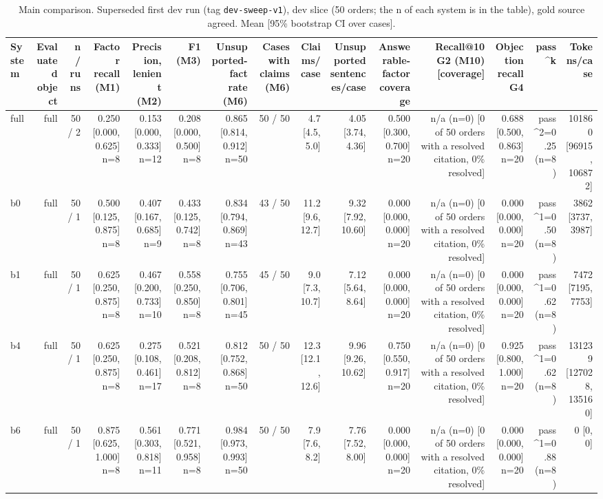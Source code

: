 \begin{table}[t]
\centering
\small
\caption{Main comparison. Superseded first dev run (tag \texttt{dev-sweep-v1}), dev slice (50 orders; the n of each system is in the table), gold source agreed. Mean [95\% bootstrap CI over cases].}
\label{tab:table1_main}
\begin{adjustbox}{max width=\textheight}
\begin{tabular}{lrrrrrrrrrrrrrr}
\toprule
System & Evaluated object & n / runs & Factor recall (M1) & Precision, lenient (M2) & F1 (M3) & Unsupported-fact rate (M6) & Cases with claims (M6) & Claims/case & Unsupported sentences/case & Answerable-factor coverage & Recall@10 G2 (M10) [coverage] & Objection recall G4 & pass\textasciicircum{}k & Tokens/case \\
\midrule
full & full & 50 / 2 & 0.250 [0.000, 0.625] n=8 & 0.153 [0.000, 0.333] n=12 & 0.208 [0.000, 0.500] n=8 & 0.865 [0.814, 0.912] n=50 & 50 / 50 & 4.7 [4.5, 5.0] & 4.05 [3.74, 4.36] & 0.500 [0.300, 0.700] n=20 & n/a (n=0) [0 of 50 orders with a resolved citation, 0\% resolved] & 0.688 [0.500, 0.863] n=20 & pass\textasciicircum{}2=0.25 (n=8) & 101860 [96915, 106872] \\
b0 & full & 50 / 1 & 0.500 [0.125, 0.875] n=8 & 0.407 [0.167, 0.685] n=9 & 0.433 [0.125, 0.742] n=8 & 0.834 [0.794, 0.869] n=43 & 43 / 50 & 11.2 [9.6, 12.7] & 9.32 [7.92, 10.60] & 0.000 [0.000, 0.000] n=20 & n/a (n=0) [0 of 50 orders with a resolved citation, 0\% resolved] & 0.000 [0.000, 0.000] n=20 & pass\textasciicircum{}1=0.50 (n=8) & 3862 [3737, 3987] \\
b1 & full & 50 / 1 & 0.625 [0.250, 0.875] n=8 & 0.467 [0.200, 0.733] n=10 & 0.558 [0.250, 0.850] n=8 & 0.755 [0.706, 0.801] n=45 & 45 / 50 & 9.0 [7.3, 10.7] & 7.12 [5.64, 8.64] & 0.000 [0.000, 0.000] n=20 & n/a (n=0) [0 of 50 orders with a resolved citation, 0\% resolved] & 0.000 [0.000, 0.000] n=20 & pass\textasciicircum{}1=0.62 (n=8) & 7472 [7195, 7753] \\
b4 & full & 50 / 1 & 0.625 [0.250, 0.875] n=8 & 0.275 [0.108, 0.461] n=17 & 0.521 [0.208, 0.812] n=8 & 0.812 [0.752, 0.868] n=50 & 50 / 50 & 12.3 [12.1, 12.6] & 9.96 [9.26, 10.62] & 0.750 [0.550, 0.917] n=20 & n/a (n=0) [0 of 50 orders with a resolved citation, 0\% resolved] & 0.925 [0.800, 1.000] n=20 & pass\textasciicircum{}1=0.62 (n=8) & 131239 [127028, 135160] \\
b6 & full & 50 / 1 & 0.875 [0.625, 1.000] n=8 & 0.561 [0.303, 0.818] n=11 & 0.771 [0.521, 0.958] n=8 & 0.984 [0.973, 0.993] n=50 & 50 / 50 & 7.9 [7.6, 8.2] & 7.76 [7.52, 8.00] & 0.000 [0.000, 0.000] n=20 & n/a (n=0) [0 of 50 orders with a resolved citation, 0\% resolved] & 0.000 [0.000, 0.000] n=20 & pass\textasciicircum{}1=0.88 (n=8) & 0 [0, 0] \\

\end{tabular}
\end{adjustbox}
\end{table}
